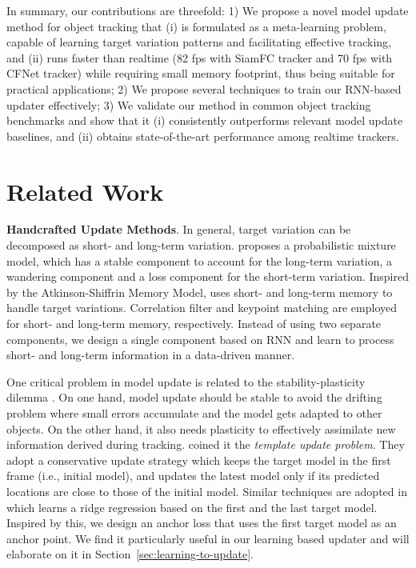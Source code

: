\documentclass[journal]{IEEEtran}
\begin{document}
In summary, our contributions are threefold: 1) We propose a novel model update method for object tracking that (i) is formulated as a meta-learning problem, capable of learning target variation patterns and facilitating effective tracking, and (ii) runs faster than realtime (82 fps with SiamFC tracker and 70 fps with CFNet tracker) while requiring small memory footprint, thus being suitable for practical applications;  2) We propose several techniques to train our RNN-based updater effectively; 3) We validate our method in common object tracking benchmarks and show that it (i) consistently outperforms relevant model update baselines, and (ii) obtains state-of-the-art performance among realtime trackers.

\section{Related Work}
\textbf{Handcrafted Update Methods}.
In general, target variation can be decomposed as short- and long-term variation. \cite{Jepson2001RobustOA} proposes a probabilistic mixture model, which has a stable component to account for the long-term variation, a wandering component and a loss component for the short-term variation. Inspired by the Atkinson-Shiffrin Memory Model, \cite{Hong2015MUltiStoreT} uses short- and long-term memory to handle target variations. Correlation filter and keypoint matching are employed for short- and long-term memory, respectively. Instead of using two separate components, we design a single component based on RNN and learn to process short- and long-term information in a data-driven manner.  

One critical problem in model update is related to the stability-plasticity dilemma \cite{Grossberg1987CompetitiveLF}. On one hand, model update should be stable to avoid the drifting problem where small errors accumulate and the model gets adapted to other objects. On the other hand, it also needs plasticity to effectively assimilate new information derived during tracking. \cite{matthews2004template} coined it the \emph{template update problem}. They adopt a conservative update strategy which keeps the target model in the first frame (i.e., initial model), and updates the latest model only if its predicted locations are close to those of the initial model. Similar techniques are adopted in \cite{guo2017learning} which learns a ridge regression based on the first and the last target model. Inspired by this, we design an anchor loss that uses the first target model as an anchor point. We find it particularly useful in our learning based updater and will elaborate on it in Section~\ref{sec:learning-to-update}. 
\end{document}
